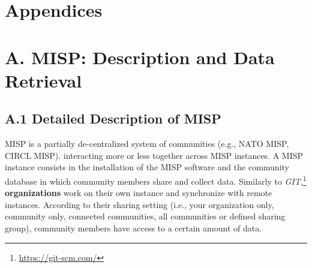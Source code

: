 \documentclass[unnumsec,webpdf,contemporary,large]{oup-authoring-template}%
\theoremstyle{thmstyleone}%
\theoremstyle{thmstyletwo}%
\theoremstyle{thmstylethree}%
\begin{document}
\begin{appendices}
\section*{Appendices}
\section{A. MISP: Description and Data Retrieval}
\label{Appendix:MISP_description}

\subsection{A.1 Detailed Description of MISP}

MISP is a partially de-centralized system of communities (e.g., NATO MISP, CIRCL MISP). interacting more or less together across MISP instances. A MISP instance consists in the installation of the MISP software and the community database in which community members share and collect data. Similarly to {\it GIT},\footnote{\url{https://git-scm.com/}} \textbf{organizations} work on their own instance and synchronize with remote instances. According to their sharing setting (i.e., your organization only, community only, connected communities, all communities or defined sharing group), community members have access to a certain amount of data.\\


\end{appendices}
\end{document}
